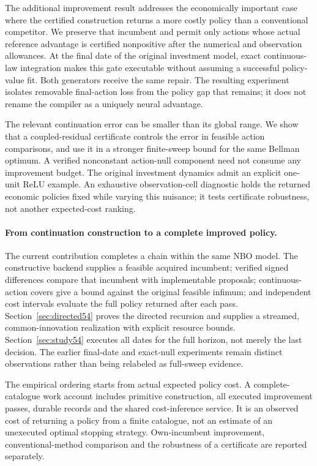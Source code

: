 \documentclass[ecta,nameyear,draft]{econsocart}
\begin{document}
The additional improvement result addresses the economically important case where the certified construction returns a more costly policy than a conventional competitor. We preserve that incumbent and permit only actions whose actual reference advantage is certified nonpositive after the numerical and observation allowances. At the final date of the original investment model, exact continuous-law integration makes this gate executable without assuming a successful policy-value fit. Both generators receive the same repair. The resulting experiment isolates removable final-action loss from the policy gap that remains; it does not rename the compiler as a uniquely neural advantage.

The relevant continuation error can be smaller than its global range. We show that a coupled-residual certificate controls the error in feasible action comparisons, and use it in a stronger finite-sweep bound for the same Bellman optimum. A verified nonconstant action-null component need not consume any improvement budget. The original investment dynamics admit an explicit one-unit ReLU example. An exhaustive observation-cell diagnostic holds the returned economic policies fixed while varying this nuisance; it tests certificate robustness, not another expected-cost ranking.

\paragraph{From continuation construction to a complete improved policy.}
The current contribution completes a chain within the same NBO model. The constructive backend supplies a feasible acquired incumbent; verified signed differences compare that incumbent with implementable proposals; continuous-action covers give a bound against the original feasible infimum; and independent cost intervals evaluate the full policy returned after each pass. Section~\ref{sec:directed54} proves the directed recursion and supplies a streamed, common-innovation realization with explicit resource bounds. Section~\ref{sec:study54} executes all dates for the full horizon, not merely the last decision. The earlier final-date and exact-null experiments remain distinct observations rather than being relabeled as full-sweep evidence.

The empirical ordering starts from actual expected policy cost. A complete-catalogue work account includes primitive construction, all executed improvement passes, durable records and the shared cost-inference service. It is an observed cost of returning a policy from a finite catalogue, not an estimate of an unexecuted optimal stopping strategy. Own-incumbent improvement, conventional-method comparison and the robustness of a certificate are reported separately.
\end{document}
